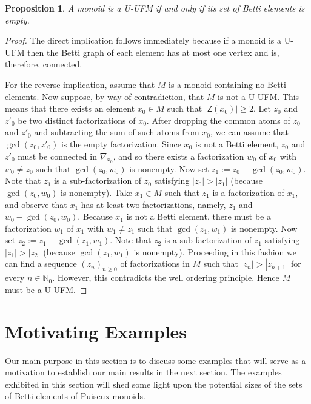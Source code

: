 \documentclass[12pt]{amsart}
\newtheorem{prop}[theorem]{Proposition}
\theoremstyle{definition}
\numberwithin{equation}{section}
\newcommand{\nn}{\mathbb{N}}
\begin{document}
\begin{prop} \label{prop:U-UFM characterization}
	A monoid is a U-UFM if and only if its set of Betti elements is empty.
\end{prop}

\begin{proof}
	The direct implication follows immediately because if a monoid is a U-UFM then the Betti graph of each element has at most one vertex and is, therefore, connected.
	\smallskip
	
	For the reverse implication, assume that $M$ is a monoid containing no Betti elements. Now suppose, by way of contradiction, that $M$ is not a U-UFM. This means that there exists an element $x_0 \in M$ such that $|\mathsf{Z}(x_0)| \ge 2$. Let $z_0$ and $z'_0$ be two distinct factorizations of $x_0$. After dropping the common atoms of $z_0$ and $z'_0$ and subtracting the sum of such atoms from $x_0$, we can assume that $\gcd(z_0, z'_0)$ is the empty factorization. Since $x_0$ is not a Betti element, $z_0$ and $z'_0$ must be connected in $\nabla_{x_0}$, and so there exists a factorization $w_0$ of $x_0$ with $w_0 \neq z_0$ such that $\gcd(z_0, w_0)$ is nonempty. Now set $z_1 := z_0 - \gcd(z_0, w_0)$. Note that $z_1$ is a sub-factorization of $z_0$ satisfying  $|z_0| > |z_1|$ (because $\gcd(z_0, w_0)$ is nonempty). Take $x_1 \in M$ such that $z_1$ is a factorization of $x_1$, and observe that $x_1$ has at least two factorizations, namely, $z_1$ and $w_0 - \gcd(z_0, w_0)$. Because $x_1$ is not a Betti element, there must be a factorization $w_1$ of $x_1$ with $w_1 \neq z_1$ such that $\gcd(z_1, w_1)$ is nonempty. Now set $z_2 := z_1 - \gcd(z_1, w_1)$. Note that $z_2$ is a sub-factorization of $z_1$ satisfying  $|z_1| > |z_2|$ (because $\gcd(z_1, w_1)$ is nonempty). Proceeding in this fashion we can find a sequence $(z_n)_{n \ge 0}$ of factorizations in $M$ such that $|z_n| > |z_{n+1}|$ for every $n \in \nn_0$. However, this contradicts the well ordering principle. Hence $M$ must be a U-UFM.
\end{proof}









\bigskip
\section{Motivating Examples}
\label{sec:examples}

Our main purpose in this section is to discuss some examples that will serve as a motivation to establish our main results in the next section. The examples exhibited in this section will shed some light upon the potential sizes of the sets of Betti elements of Puiseux monoids.
\smallskip
\end{document}
